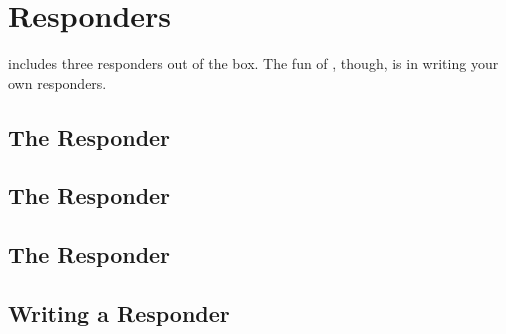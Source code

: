 \section{Responders \label{responders}}

 includes three responders out of the box. The fun of
, though, is in writing your own responders.


\subsection{The  Responder \label{multiple}}
\subsection{The  Responder \label{multiple}}
\subsection{The  Responder \label{multiple}}
\subsection{Writing a Responder \label{writing-a-responder}}
